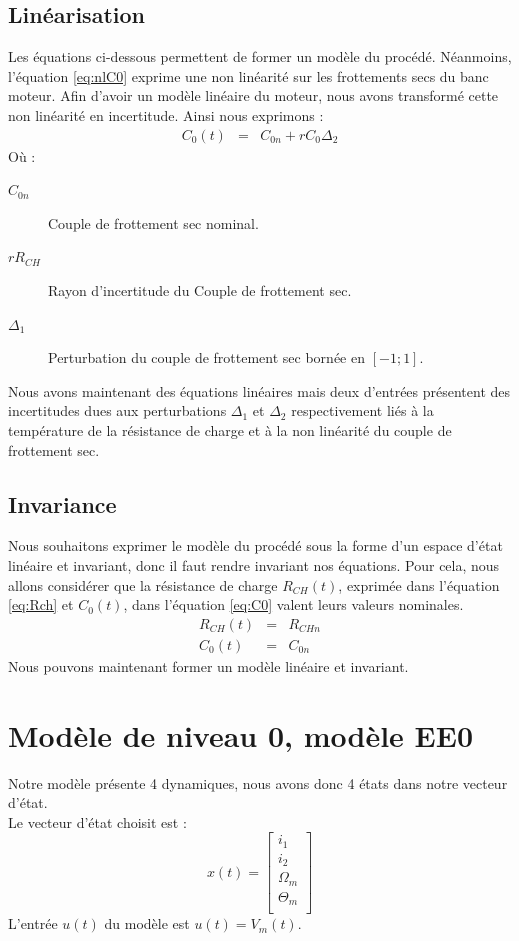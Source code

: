 \subsection{Linéarisation}
Les équations ci-dessous permettent de former un modèle du procédé. Néanmoins, l'équation \ref{eq:nlC0} exprime une non linéarité sur les frottements secs du banc moteur. Afin d'avoir un modèle linéaire du moteur, nous avons transformé cette non linéarité en incertitude.
Ainsi nous exprimons : 
\begin{eqnarray}
\label{eq:C0} C_0(t) &=& C_{0n} + rC_0 \Delta_2
\end{eqnarray}
O\`u : 
\begin{description}
\item[$C_{0n}$] Couple de frottement sec nominal.
\item[$rR_{CH}$] Rayon d'incertitude du Couple de frottement sec.
\item[$\Delta_1$] Perturbation du couple de frottement sec bornée en $[-1 ; 1]$.
\end{description}
Nous avons maintenant des équations linéaires mais deux d'entrées présentent des incertitudes dues aux perturbations $\Delta_1$ et $ \Delta_2$ respectivement liés à la température de la résistance de charge et à la non linéarité du couple de frottement sec.
\subsection{Invariance}
Nous souhaitons exprimer le modèle du procédé sous la forme d'un espace d'état linéaire et invariant, donc il faut rendre invariant nos équations. Pour cela, nous allons considérer que la résistance de charge $R_{CH}(t)$, exprimée dans l'équation \ref{eq:Rch} et $C_0(t)$, dans l'équation \ref{eq:C0} valent leurs valeurs nominales. 
\begin{eqnarray}
R_{CH}(t) &=& R_{CHn} \\
C_0(t)    &=& C_{0n}
\end{eqnarray}
Nous pouvons maintenant former un modèle linéaire et invariant.
\section{Modèle de niveau 0, modèle EE0}
Notre modèle présente 4 dynamiques, nous avons donc 4 états dans notre vecteur d'état.\\

Le vecteur d'état choisit est :
\begin{equation}
x(t)=\begin{bmatrix}
i_1\\
i_2\\
\Omega_m\\
\Theta_m\\
\end{bmatrix}
\end{equation} 
L'entrée $u(t)$ du modèle est $u(t)=V_m(t)$.\\

